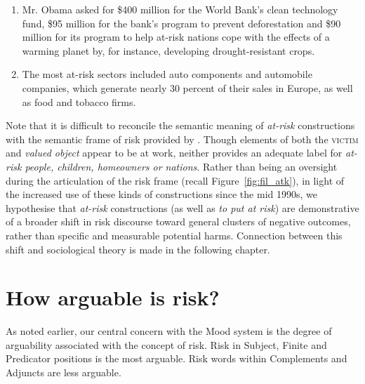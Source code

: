     \begin{enumerate}  [before=\itshape,font=\normalfont] \setlength\itemsep{0em} \small
    \item Mr. Obama asked for \$400 million for the World Bank's clean technology fund, \$95 million for the bank's program to prevent deforestation and \$90 million for its program to help at-risk nations cope with the effects of a warming planet by, for instance, developing drought-resistant crops.
    \item The most at-risk sectors included auto components and automobile companies, which generate nearly 30 percent of their sales in Europe, as well as food and tobacco firms.
    \end{enumerate}

    Note that it is difficult to reconcile the semantic meaning of \emph{at-risk} constructions with the semantic frame of risk provided by . Though elements of both the \textsc{victim} and \emph{valued object} appear to be at work, neither provides an adequate label for \emph{at-risk people, children, homeowners or nations}. Rather than being an oversight during the articulation of the risk frame (recall Figure~\ref{fig:fil_atk}), in light of the increased use of these kinds of constructions since the mid 1990s, we hypothesise that \emph{at-risk} constructions (as well as \emph{to put at risk}) are demonstrative of a broader shift in risk discourse toward general clusters of negative outcomes, rather than specific and measurable potential harms. Connection between this shift and sociological theory is made in the following chapter.

    \vspace{5mm}\noindent\begin{tcolorbox}[colback=yellow!5,colframe=yellow!40!black,title=Summary: participants modified by risk]
    \parbox{1\textwidth}{%
    While risk as a modifier is often used in the context of finance\slash commerce, \emph{at-risk} typically attaches to vulnerable human demographics.}}
    \end{tcolorbox}
    \vspace{5mm}

    \section{How arguable is risk?} \label{sect:arguability}
    \FloatBarrier

    As noted earlier, our central concern with the Mood system is the degree of arguability associated with the concept of risk. Risk in Subject, Finite and Predicator positions is the most arguable. Risk words within Complements and Adjuncts are less arguable.

